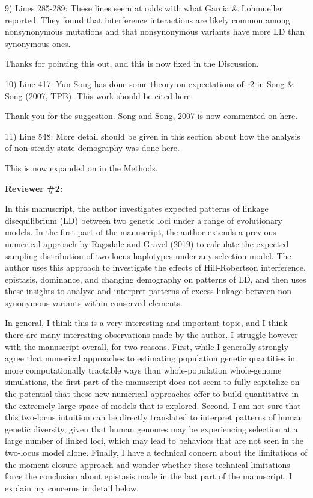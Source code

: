 \documentclass{article}
\newenvironment{response}%
  {\list{}{\leftmargin=0.5in\rightmargin=0.5in\color{blue}}\item[]}%
  {\endlist}
\begin{document}
9) Lines 285-289: These lines seem at odds with what Garcia \& Lohmueller
reported. They found that interference interactions are likely common among
nonsynonymous mutations and that nonsynonymous variants have more LD than
synonymous ones.

\begin{response}
    Thanks for pointing this out, and this is now fixed in the Discussion.
\end{response}

10) Line 417: Yun Song has done some theory on expectations of r2 in Song \&
Song (2007, TPB). This work should be cited here.

\begin{response}
    Thank you for the suggestion. Song and Song, 2007 is now commented on here.
\end{response}

11) Line 548: More detail should be given in this section about how the
analysis of non-steady state demography was done here.

\begin{response}
    This is now expanded on in the Methods.
\end{response}



\textbf{Reviewer \#2:}

In this manuscript, the author investigates expected patterns of linkage
disequilibrium (LD) between two genetic loci under a range of evolutionary
models. In the first part of the manuscript, the author extends a previous
numerical approach by Ragsdale and Gravel (2019) to calculate the expected
sampling distribution of two-locus haplotypes under any selection model. The
author uses this approach to investigate the effects of Hill-Robertson
interference, epistasis, dominance, and changing demography on patterns of LD,
and then uses these insights to analyze and interpret patterns of excess
linkage between non synonymous variants within conserved elements.

In general, I think this is a very interesting and important topic, and I think
there are many interesting observations made by the author. I struggle however
with the manuscript overall, for two reasons. First, while I generally strongly
agree that numerical approaches to estimating population genetic quantities in
more computationally tractable ways than whole-population whole-genome
simulations, the first part of the manuscript does not seem to fully capitalize
on the potential that these new numerical approaches offer to build
quantitative in the extremely large space of models that is explored. Second, I
am not sure that this two-locus intuition can be directly translated to
interpret patterns of human genetic diversity, given that human genomes may be
experiencing selection at a large number of linked loci, which may lead to
behaviors that are not seen in the two-locus model alone. Finally, I have a
technical concern about the limitations of the moment closure approach and
wonder whether these technical limitations force the conclusion about epistasis
made in the last part of the manuscript. I explain my concerns in detail below.
\end{document}
